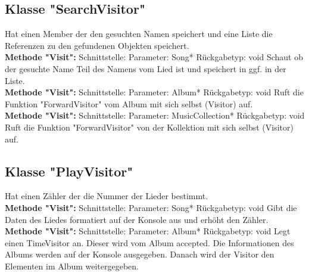 \documentclass[12pt,a4paper]{article}
\begin{document}
\subsection {Klasse "SearchVisitor"}
Hat einen Member der den gesuchten Namen speichert und eine Liste die Referenzen zu den gefundenen Objekten speichert.
\\

\textbf {Methode "Visit": } 
\newline
Schnittstelle: 
\newline
Parameter: Song*
\newline
Rückgabetyp: void
\newline
Schaut ob der gesuchte Name Teil des Namens vom Lied ist und speichert in ggf. in der Liste.
\\

\textbf {Methode "Visit": } 
\newline
Schnittstelle: 
\newline
Parameter: Album*
\newline
Rückgabetyp: void
\newline
Ruft die Funktion "ForwardVisitor" vom Album mit sich selbst (Visitor) auf.
\\

\textbf {Methode "Visit": } 
\newline
Schnittstelle: 
\newline
Parameter: MusicCollection*
\newline
Rückgabetyp: void
\newline
Ruft die Funktion "ForwardVisitor" von der Kollektion mit sich selbst (Visitor) auf.
\\

\subsection {Klasse "PlayVisitor"}
Hat einen Zähler der die Nummer der Lieder bestimmt.
\\

\textbf {Methode "Visit": } 
\newline
Schnittstelle: 
\newline
Parameter: Song*
\newline
Rückgabetyp: void
\newline
Gibt die Daten des Liedes formatiert auf der Konsole aus und erhöht den Zähler.
\\

\textbf {Methode "Visit": } 
\newline
Schnittstelle: 
\newline
Parameter: Album*
\newline
Rückgabetyp: void
\newline
Legt einen TimeVisitor an. Dieser wird vom Album accepted. Die Informationen des Albums werden auf der Konsole ausgegeben. Danach wird der Visitor den Elementen im Album weitergegeben.
\\
\end{document}
